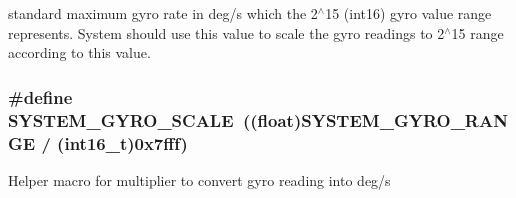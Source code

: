 standard maximum gyro rate in deg/s which the 2$^\wedge$15 (int16) gyro value range represents. System should use this value to scale the gyro readings to 2$^\wedge$15 range according to this value. \hypertarget{group__syscalls_ga8339dd5d6d4fd7f8029a2331bd7d511b}{
\subsubsection[{S\+Y\+S\+T\+E\+M\+\_\+\+G\+Y\+R\+O\+\_\+\+S\+C\+A\+L\+E}]{\setlength{\rightskip}{0pt plus 5cm}\#define S\+Y\+S\+T\+E\+M\+\_\+\+G\+Y\+R\+O\+\_\+\+S\+C\+A\+L\+E~((float){\bf S\+Y\+S\+T\+E\+M\+\_\+\+G\+Y\+R\+O\+\_\+\+R\+A\+N\+G\+E} / (int16\+\_\+t)0x7fff)}}\label{group__syscalls_ga8339dd5d6d4fd7f8029a2331bd7d511b}
Helper macro for multiplier to convert gyro reading into deg/s 